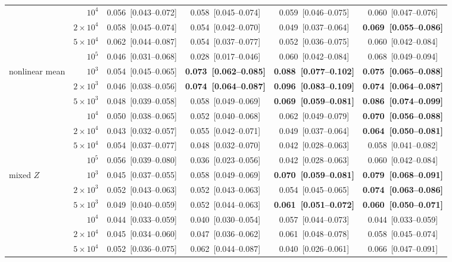 \begin{table}[p]
{\begin{tabular}{lrcccc}
 & $10^4$ & 0.056~[0.043--0.072] & 0.058~[0.045--0.074] & 0.059~[0.046--0.075] & 0.060~[0.047--0.076] \\
 & $2\times10^4$ & 0.058~[0.045--0.074] & 0.054~[0.042--0.070] & 0.049~[0.037--0.064] & \textbf{0.069~[0.055--0.086]} \\
 & $5\times10^4$ & 0.062~[0.044--0.087] & 0.054~[0.037--0.077] & 0.052~[0.036--0.075] & 0.060~[0.042--0.084] \\
 & $10^5$ & 0.046~[0.031--0.068] & 0.028~[0.017--0.046] & 0.060~[0.042--0.084] & 0.068~[0.049--0.094] \\
\midrule
nonlinear mean & $10^3$ & 0.054~[0.045--0.065] & \textbf{0.073~[0.062--0.085]} & \textbf{0.088~[0.077--0.102]} & \textbf{0.075~[0.065--0.088]} \\
 & $2\times10^3$ & 0.046~[0.038--0.056] & \textbf{0.074~[0.064--0.087]} & \textbf{0.096~[0.083--0.109]} & \textbf{0.074~[0.064--0.087]} \\
 & $5\times10^3$ & 0.048~[0.039--0.058] & 0.058~[0.049--0.069] & \textbf{0.069~[0.059--0.081]} & \textbf{0.086~[0.074--0.099]} \\
 & $10^4$ & 0.050~[0.038--0.065] & 0.052~[0.040--0.068] & 0.062~[0.049--0.079] & \textbf{0.070~[0.056--0.088]} \\
 & $2\times10^4$ & 0.043~[0.032--0.057] & 0.055~[0.042--0.071] & 0.049~[0.037--0.064] & \textbf{0.064~[0.050--0.081]} \\
 & $5\times10^4$ & 0.054~[0.037--0.077] & 0.048~[0.032--0.070] & 0.042~[0.028--0.063] & 0.058~[0.041--0.082] \\
 & $10^5$ & 0.056~[0.039--0.080] & 0.036~[0.023--0.056] & 0.042~[0.028--0.063] & 0.060~[0.042--0.084] \\
\midrule
mixed $Z$ & $10^3$ & 0.045~[0.037--0.055] & 0.058~[0.049--0.069] & \textbf{0.070~[0.059--0.081]} & \textbf{0.079~[0.068--0.091]} \\
 & $2\times10^3$ & 0.052~[0.043--0.063] & 0.052~[0.043--0.063] & 0.054~[0.045--0.065] & \textbf{0.074~[0.063--0.086]} \\
 & $5\times10^3$ & 0.049~[0.040--0.059] & 0.052~[0.044--0.063] & \textbf{0.061~[0.051--0.072]} & \textbf{0.060~[0.050--0.071]} \\
 & $10^4$ & 0.044~[0.033--0.059] & 0.040~[0.030--0.054] & 0.057~[0.044--0.073] & 0.044~[0.033--0.059] \\
 & $2\times10^4$ & 0.045~[0.034--0.060] & 0.047~[0.036--0.062] & 0.061~[0.048--0.078] & 0.058~[0.045--0.074] \\
 & $5\times10^4$ & 0.052~[0.036--0.075] & 0.062~[0.044--0.087] & 0.040~[0.026--0.061] & 0.066~[0.047--0.091] \\

\end{tabular}}
\end{table}
